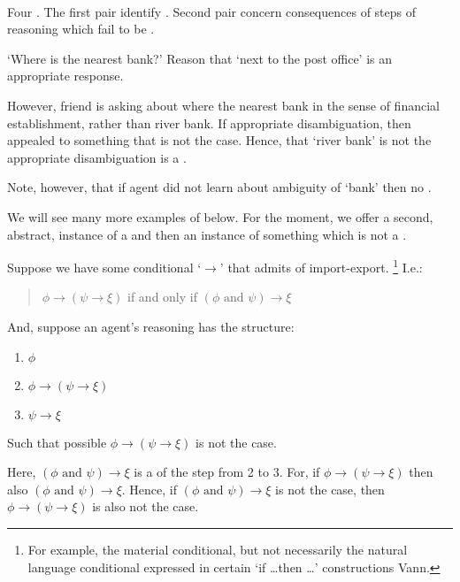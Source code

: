 \paragraph{}

\begin{note}
  Four .
  The first pair identify .
  Second pair concern consequences of steps of reasoning which fail to be .
\end{note}

\begin{note}
  \begin{illustration}
    \label{illu:requ:bank}
    `Where is the nearest bank?'
    Reason that `next to the post office' is an appropriate response.
  \end{illustration}
  However, friend is asking about where the nearest bank in the sense of financial establishment, rather than river bank.
  If appropriate disambiguation, then appealed to something that is not the case.
  Hence, that `river bank' is not the appropriate disambiguation is a \requ{}.

  Note, however, that if agent did not learn about ambiguity of `bank' then no \requ{}.
\end{note}

\begin{note}
  We will see many more examples of  below.
  For the moment, we offer a second, abstract, instance of a \requ{} and then an instance of something which is not a \requ{}.
\end{note}

\begin{note}
  \begin{illustration}
    \label{illu:requ:import-export}
    Suppose we have some conditional `\(\rightarrow\)' that admits of import-export.\nolinebreak
    \footnote{
      For example, the material conditional, but not necessarily the natural language conditional expressed in certain `if \dots then \dots' constructions {\color{red} Vann}.
    }
    I.e.:
    \begin{quote}
      \(\phi \rightarrow (\psi \rightarrow \xi)\) if and only if \((\phi \text{ and } \psi) \rightarrow \xi\)
    \end{quote}
    And, suppose an agent's reasoning has the structure:
    \begin{enumerate}
    \item \(\phi\)
    \item \(\phi \rightarrow (\psi \rightarrow \xi)\)
    \item \(\psi \rightarrow \xi\)
    \end{enumerate}
    Such that possible \(\phi \rightarrow (\psi \rightarrow \xi)\) is not the case.
  \end{illustration}

  Here, \((\phi \text{ and } \psi) \rightarrow \xi\) is a \prequ{} of the step from 2 to 3.
  For, if \(\phi \rightarrow (\psi \rightarrow \xi)\) then also \((\phi \text{ and } \psi) \rightarrow \xi\).
  Hence, if \((\phi \text{ and } \psi) \rightarrow \xi\) is not the case, then \(\phi \rightarrow (\psi \rightarrow \xi)\) is also not the case.
\end{note}

